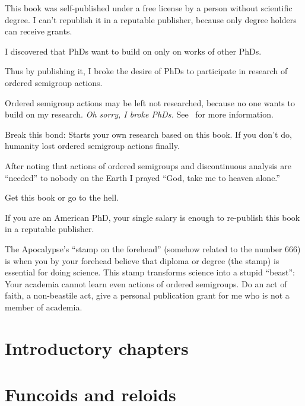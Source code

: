 \documentclass[a4paper,oneside,english,reqno]{amsbook}
\numberwithin{section}{chapter}
\let\noindent\empty %
\begin{document}
{
  \huge
This book was self-published under a free license by a person without scientific degree.
I can't republish it in a reputable publisher, because only degree holders can receive grants.

I discovered that PhDs want to build on only on works of other PhDs.

Thus by publishing it, I broke the desire of PhDs to participate in research of ordered semigroup actions.

Ordered semigroup actions may be left not researched, because no one wants to build on my research.
\emph{Oh sorry, I broke PhDs.} See~\cite{broke-science} for more information.

Break this bond: Starts your own research based on this book. If you don't do, humanity lost ordered semigroup actions finally.

\noindent\makebox[\linewidth]{\rule{\textwidth}{0.4pt}}

After noting that actions of ordered semigroups and discontinuous analysis are ``needed''
to nobody on the Earth I prayed ``God, take me to heaven alone.''

Get this book or go to the hell.

If you are an American PhD, your single salary is enough to re-publish this book in
a reputable publisher.

The Apocalypse's ``stamp on the forehead'' (somehow related to the number 666) is when
you by your forehead believe that diploma or degree (the stamp) is essential for doing science.
This stamp transforms science into a stupid ``beast'': Your academia cannot learn even
actions of ordered semigroups. Do an act of faith, a non-beastile act, give a personal publication
grant for me who is not a member of academia.
}

\tableofcontents{}

\part{Introductory chapters}







\part{Funcoids and reloids}













\end{document}
